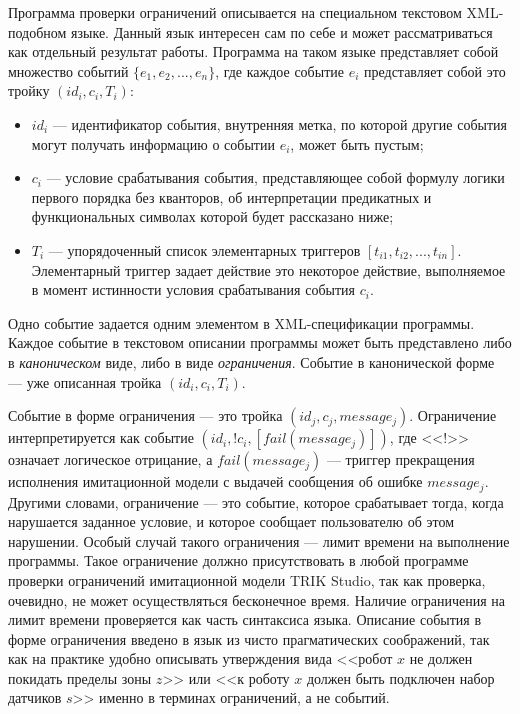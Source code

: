 \documentclass[a5paper]{article}
\begin{document}
Программа проверки ограничений описывается на специальном текстовом XML-подобном языке. Данный язык интересен сам по себе и может рассматриваться как отдельный результат работы. Программа на таком языке представляет собой множество событий $\{ e_1, e_2, ..., e_n \}$, где каждое событие 
$e_i$ представляет собой это тройку $(id_i, c_i, T_i)$:

\begin{itemize}
    \item $id_i$ --- идентификатор события, внутренняя метка, по которой другие события могут получать информацию о событии $e_i$, может быть пустым;
    \item $c_i$ --- условие срабатывания события, представляющее собой формулу логики первого порядка без кванторов, об интерпретации предикатных и функциональных символах которой будет рассказано ниже;
    \item $T_i$ --- упорядоченный список элементарных триггеров $[ t_{i1}, t_{i2}, ..., t_{in} ]$. Элементарный триггер задает действие это некоторое 
            действие, выполняемое в момент истинности условия срабатывания события $c_i$.
\end{itemize}

Одно событие задается одним элементом в XML-спецификации программы. Каждое событие в текстовом описании 
программы может быть представлено либо в \textit{каноническом} виде, либо в виде \textit{ограничения}. Событие в канонической форме --- уже описанная тройка $(id_i, c_i, T_i)$.

Событие в форме ограничения --- это тройка $(id_j, c_j, message_j)$. Ограничение интерпретируется как событие $(id_i, !c_i, [ fail(message_j) ])$, где <<!>> означает логическое отрицание, а $fail(message_j)$ --- триггер прекращения исполнения имитационной модели с выдачей сообщения об ошибке $message_j$. Другими словами, ограничение --- это событие, которое срабатывает тогда, когда нарушается заданное условие, и которое сообщает пользователю об этом нарушении. Особый случай такого ограничения --- лимит времени на выполнение программы. Такое ограничение должно присутствовать в любой программе проверки ограничений имитационной модели TRIK Studio, так как проверка, очевидно, не может осуществляться бесконечное время. Наличие ограничения на лимит времени проверяется как часть синтаксиса языка. Описание события в форме ограничения введено в язык из чисто прагматических соображений, так как на практике удобно описывать утверждения вида <<робот $x$ не должен покидать пределы зоны $z$>> или <<к роботу $x$ должен быть подключен набор датчиков $s$>> именно в терминах ограничений, а не событий.
\end{document}
